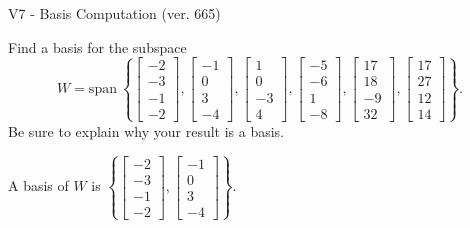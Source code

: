 \begin{exercise}
  \begin{exerciseTitle}V7 - Basis Computation (ver. 665)\end{exerciseTitle}
  \begin{exerciseStatement}
    Find a basis for the subspace 
\[W=\mathrm{span}\ \left\{\left[\begin{array}{r}
-2 \\
-3 \\
-1 \\
-2
\end{array}\right] , \left[\begin{array}{r}
-1 \\
0 \\
3 \\
-4
\end{array}\right] , \left[\begin{array}{r}
1 \\
0 \\
-3 \\
4
\end{array}\right] , \left[\begin{array}{r}
-5 \\
-6 \\
1 \\
-8
\end{array}\right] , \left[\begin{array}{r}
17 \\
18 \\
-9 \\
32
\end{array}\right] , \left[\begin{array}{r}
17 \\
27 \\
12 \\
14
\end{array}\right]\right\}.\]
 Be sure to explain why your result is a basis.


  \end{exerciseStatement}
  \begin{exerciseAnswer}
   A basis of \(W\) is  \(\left\{\left[\begin{array}{r}
-2 \\
-3 \\
-1 \\
-2
\end{array}\right] , \left[\begin{array}{r}
-1 \\
0 \\
3 \\
-4
\end{array}\right]\right\}\).
  


  \end{exerciseAnswer}
\end{exercise}